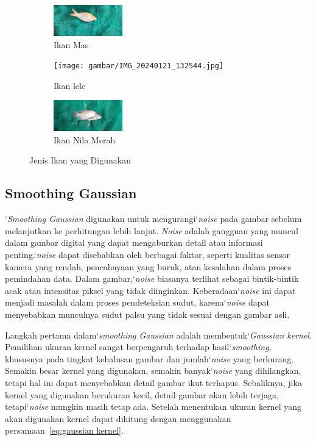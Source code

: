 \begin{figure}
	\centering
	\begin{subfigure}{.3\textwidth}
		\centering
        \includegraphics[keepaspectratio, width=3cm]{gambar/IMG_20240121_131125.jpg}
		\caption{Ikan Mas}
	\end{subfigure}
	\begin{subfigure}{.3\textwidth}
		\centering
		\texttt{[image: gambar/IMG\_20240121\_132544.jpg]}
		\caption{Ikan lele}
	\end{subfigure} 
	\begin{subfigure}{.3\textwidth}
		\centering
		\includegraphics[keepaspectratio, width=3cm]{gambar/IMG_20240121_140044.jpg}
		\caption{Ikan Nila Merah}
	\end{subfigure}
	\caption{Jenis Ikan yang Digunakan}\label{fig:dataset}
\end{figure}

\subsection{Smoothing Gaussian}
   `\emph{Smoothing Gaussian} digunakan untuk mengurangi`\emph{noise} pada gambar sebelum melanjutkan ke perhitungan lebih lanjut.
\emph{Noise} adalah gangguan yang muncul dalam gambar digital yang dapat mengaburkan detail atau informasi penting.`\emph{noise} dapat disebabkan oleh berbagai faktor, seperti kualitas sensor kamera yang rendah, pencahayaan yang buruk, atau kesalahan dalam proses pemindahan data.
Dalam gambar,`\emph{noise} biasanya terlihat sebagai bintik-bintik acak atau intensitas piksel yang tidak diinginkan. Keberadaan`\emph{noise} ini dapat menjadi masalah dalam proses pendeteksian sudut, karena`\emph{noise} dapat menyebabkan munculnya sudut palsu yang tidak sesuai dengan gambar asli.
    
    Langkah pertama dalam`\emph{smoothing Gaussian} adalah membentuk`\emph{Gaussian kernel}. Pemilihan ukuran kernel sangat berpengaruh terhadap hasil`\emph{smoothing}, khususnya pada tingkat kehalusan gambar dan jumlah`\emph{noise} yang berkurang.
Semakin besar kernel yang digunakan, semakin banyak`\emph{noise} yang dihilangkan, tetapi hal ini dapat menyebabkan detail gambar ikut terhapus. Sebaliknya, jika kernel yang digunakan berukuran kecil, detail gambar akan lebih terjaga, tetapi`\emph{noise} mungkin masih tetap ada.
Setelah menentukan ukuran kernel yang akan digunakan kernel dapat dihitung dengan menggunakan persamaan~\eqref{eq:gaussian kernel}.

